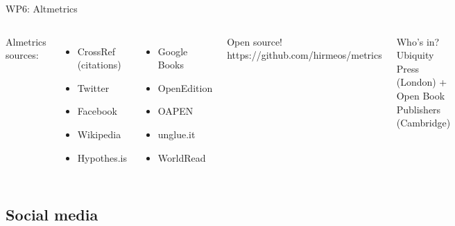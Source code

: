 \documentclass[xcolor=svgnames]{beamer}
\begin{document}
        \begin{frame}{WP6: Altmetrics}
            \begin{columns}[c]
                    Almetrics sources:
                    \begin{columns}[c]
                            \begin{itemize}
                                \item CrossRef (citations)
                                \item Twitter
                                \item Facebook
                                \item Wikipedia
                                \item Hypothes.is
                            \end{itemize}
                            \begin{itemize}
                                \item Google Books
                                \item OpenEdition
                                \item OAPEN
                                \item unglue.it
                                \item WorldRead
                            \end{itemize}
                    \end{columns}
                    \pause
                    \vspace{0.05\textheight}
                    \begin{block}{Open source!}
                        https://github.com/hirmeos/metrics
                    \end{block}
                    \pause
                    \vspace{0.05\textheight}
                    \begin{block}{Who's in?}
                        Ubiquity Press (London) + Open Book Publishers (Cambridge)
                    \end{block}
            \end{columns}
        \end{frame}

    \subsection{Social media}
\end{document}
